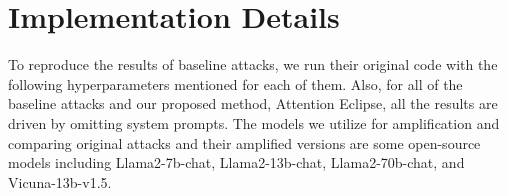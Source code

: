 \begin{table}[h]
\centering
{}
\caption{the number of prompts for each category of AdvBench And HarmBench datasets.}
\label{table: datasets_statistics}
\end{table}



\section{Implementation Details}
\label{sec: baseline_settings}

To reproduce the results of baseline attacks, we run their original code with the following hyperparameters mentioned for each of them. Also, for all of the baseline attacks and our proposed method, Attention Eclipse, all the results are driven by omitting system prompts. The models we utilize for amplification and comparing original attacks and their amplified versions are some open-source models including Llama2-7b-chat, Llama2-13b-chat, Llama2-70b-chat, and Vicuna-13b-v1.5. \\

